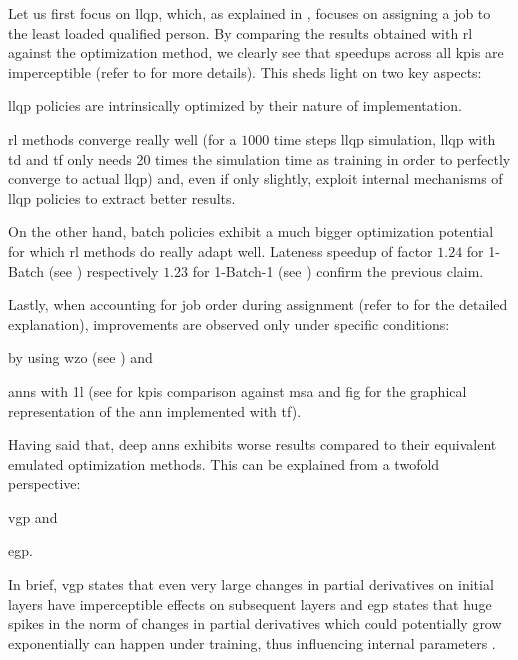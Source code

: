 Let us first focus on \gls{llqp}, which, as explained in , focuses on assigning a job to the least loaded qualified person. By comparing the results obtained with \gls{rl} against the optimization method, we clearly see that speedups across all \glspl{kpi} are imperceptible (refer to  for more details). This sheds light on two key aspects:
\begin{enumerate*}
	\item \gls{llqp} policies are intrinsically optimized by their nature of implementation.
	\item \gls{rl} methods converge really well (for a $1000$ time steps \gls{llqp} simulation, \gls{llqp} with \gls{td} and \gls{tf} only needs 20 times the simulation time as training in order to perfectly converge to actual \gls{llqp}) and, even if only slightly, exploit internal mechanisms of \gls{llqp} policies to extract better results.
\end{enumerate*}

On the other hand, batch policies exhibit a much bigger optimization potential for which \gls{rl} methods do really adapt well. Lateness speedup of factor $1.24$ for 1-Batch (see ) respectively $1.23$ for 1-Batch-1 (see ) confirm the previous claim.

Lastly, when accounting for job order during assignment (refer to  for the detailed explanation), improvements are observed only under specific conditions:
\begin{enumerate*}
	\item by using \gls{wzo} (see ) and 
	\item \glspl{ann} with \gls{1l} (see  for \glspl{kpi} comparison against \gls{msa} and fig for the graphical representation of the \gls{ann} implemented with \gls{tf}).
\end{enumerate*}

Having said that, deep \glspl{ann} exhibits worse results compared to their equivalent emulated optimization methods. This can be explained from a twofold perspective:
\begin{enumerate*}
	\item \gls{vgp} and
	\item \gls{egp}.
\end{enumerate*}

In brief, \gls{vgp} states that even very large changes in partial derivatives on initial layers have imperceptible effects on subsequent layers \citep{Bengio1994} and \gls{egp} states that huge spikes in the norm of changes in partial derivatives which could potentially grow exponentially can happen under training, thus influencing internal parameters \citep{Bengio1994,Pascanu2012}.

